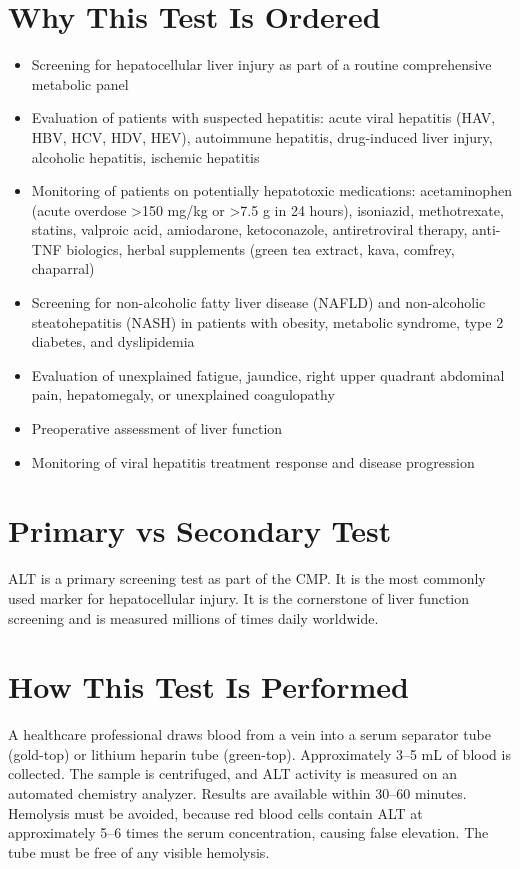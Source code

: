 \section*{Why This Test Is Ordered}
\begin{itemize}
  \item Screening for hepatocellular liver injury as part of a routine comprehensive metabolic panel
  \item Evaluation of patients with suspected hepatitis: acute viral hepatitis (HAV, HBV, HCV, HDV, HEV), autoimmune hepatitis, drug-induced liver injury, alcoholic hepatitis, ischemic hepatitis
  \item Monitoring of patients on potentially hepatotoxic medications: acetaminophen (acute overdose >150 mg/kg or >7.5 g in 24 hours), isoniazid, methotrexate, statins, valproic acid, amiodarone, ketoconazole, antiretroviral therapy, anti-TNF biologics, herbal supplements (green tea extract, kava, comfrey, chaparral)
  \item Screening for non-alcoholic fatty liver disease (NAFLD) and non-alcoholic steatohepatitis (NASH) in patients with obesity, metabolic syndrome, type 2 diabetes, and dyslipidemia
  \item Evaluation of unexplained fatigue, jaundice, right upper quadrant abdominal pain, hepatomegaly, or unexplained coagulopathy
  \item Preoperative assessment of liver function
  \item Monitoring of viral hepatitis treatment response and disease progression
\end{itemize}

\section*{Primary vs Secondary Test}
ALT is a primary screening test as part of the CMP. It is the most commonly used marker for hepatocellular injury. It is the cornerstone of liver function screening and is measured millions of times daily worldwide.

\section*{How This Test Is Performed}
A healthcare professional draws blood from a vein into a serum separator tube (gold-top) or lithium heparin tube (green-top). Approximately 3--5 mL of blood is collected. The sample is centrifuged, and ALT activity is measured on an automated chemistry analyzer. Results are available within 30--60 minutes. Hemolysis must be avoided, because red blood cells contain ALT at approximately 5--6 times the serum concentration, causing false elevation. The tube must be free of any visible hemolysis.

